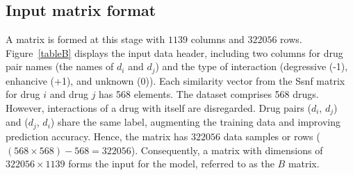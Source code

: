 \documentclass[unnumsec,webpdf,contemporary,large]{oup-authoring-template}%
\theoremstyle{thmstyleone}%
\theoremstyle{thmstyletwo}%
\theoremstyle{thmstylethree}%
\begin{document}
\subsection{Input matrix format}

A matrix is formed at this stage with $1139$ columns and $322056$ rows. Figure~\ref{tableB} displays the input data header, including two columns for drug pair names (the names of $d_i$ and $d_j$) and the type of interaction (degressive (-1), enhancive (+1), and unknown (0)). Each similarity vector from the Ssnf matrix for drug $i$ and drug $j$ has 568 elements.
The dataset comprises 568 drugs. However, interactions of a drug with itself are disregarded. Drug pairs ($d_i$, $d_j$) and ($d_j$, $d_i$) share the same label, augmenting the training data and improving prediction accuracy. Hence, the matrix has $322056$ data samples or rows ($(568 \times 568) - 568 = 322056$). Consequently, a matrix with dimensions of $322056 \times 1139$ forms the input for the model, referred to as the $B$ matrix.
\end{document}
